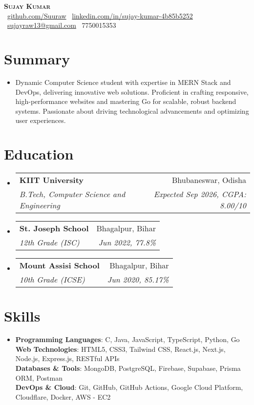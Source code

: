 \documentclass[letterpaper,11pt]{article}
\makeatletter
\newcommand{\resumeSubheading}[4]{
  \vspace{-4pt}\item
  \begin{tabular*}{0.98\textwidth}[t]{l@{\extracolsep{\fill}}r}
    \textbf{#1} & #2 \\
    \textit{\small#3} & \textit{\small #4} \\
  \end{tabular*}\vspace{-8pt}
}
\newcommand{\resumeSubHeadingListStart}{\begin{itemize}[leftmargin=0.1in, label={}]}
\newcommand{\resumeSubHeadingListEnd}{\end{itemize}\vspace{-8pt}}
\makeatother
\begin{document}
\begin{center}
  \textbf{\Huge \scshape Sujay Kumar} \\ \vspace{12pt}
  \small
  \vspace{10pt}
  \faGithub\ \href{https://github.com/Suuraw}{github.com/Suuraw} \quad
  \faLinkedin\ \href{https://linkedin.com/in/sujay-kumar-4b85b5252}{linkedin.com/in/sujay-kumar-4b85b5252} \quad
  \faEnvelope\ \href{mailto:sujayraw13@gmail.com}{sujayraw13@gmail.com} \quad
  \faPhone\ 7750015353
\end{center}
\vspace{-10pt}

\section{Summary}
\vspace{6pt}
\resumeSubHeadingListStart
  \item{Dynamic Computer Science student with expertise in MERN Stack and DevOps, delivering innovative web solutions. Proficient in crafting responsive, high-performance websites and mastering Go for scalable, robust backend systems. Passionate about driving technological advancements and optimizing user experiences.}
\resumeSubHeadingListEnd

\section{Education}
\vspace{6pt}
\resumeSubHeadingListStart
  \resumeSubheading{KIIT University}{Bhubaneswar, Odisha}{B.Tech, Computer Science and Engineering}{Expected Sep 2026, CGPA: 8.00/10}
  \resumeSubheading{St. Joseph School}{Bhagalpur, Bihar}{12th Grade (ISC)}{Jun 2022, 77.8\%}
  \resumeSubheading{Mount Assisi School}{Bhagalpur, Bihar}{10th Grade (ICSE)}{Jun 2020, 85.17\%}
\resumeSubHeadingListEnd

\section{Skills}
\vspace{6pt}
\resumeSubHeadingListStart
  \item{
    \textbf{Programming Languages}: C, Java, JavaScript, TypeScript, Python, Go \\ \vspace{2pt}
    \textbf{Web Technologies}: HTML5, CSS3, Tailwind CSS, React.js, Next.js, Node.js, Express.js, RESTful APIs \\ \vspace{2pt}
    \textbf{Databases \& Tools}: MongoDB, PostgreSQL, Firebase, Supabase, Prisma ORM, Postman \\  \vspace{2pt}
    \textbf{DevOps \& Cloud}: Git, GitHub, GitHub Actions, Google Cloud Platform, Cloudflare, Docker, AWS - EC2
  }
\resumeSubHeadingListEnd
\end{document}
